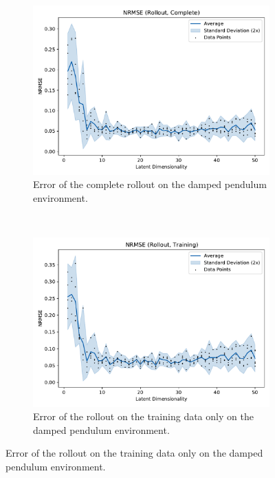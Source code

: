 			\begin{figure}
				\centering
				\begin{subfigure}{0.7\linewidth}
					\centering
					\includegraphics[width=\linewidth]{figures/results/pendulum-damped/latent-dim/comparison-rmse-rollout-normalized-mean-vs-latent-dim.pdf}
					\caption{Error of the complete rollout on the damped pendulum environment.}
					\label{fig:pendulumDampedRmseComplete}
				\end{subfigure} \\
				\begin{subfigure}{0.5\linewidth}
					\centering
					\includegraphics[width=\linewidth]{figures/results/pendulum-damped/latent-dim/comparison-rmse-rollout-train-normalized-mean-vs-latent-dim.pdf}
					\caption{Error of the rollout on the training data only on the damped pendulum environment.}

\end{subfigure}
\end{figure}
